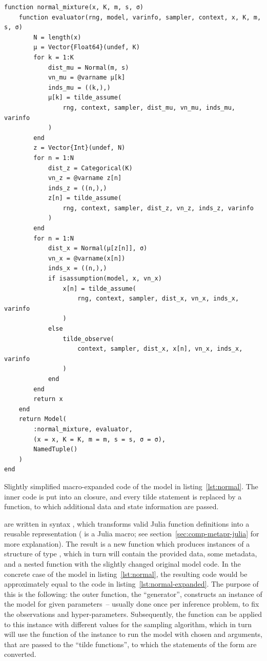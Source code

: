 \begin{lstfloat}
  \begin{lstlisting}[style=lstfloat]
function normal_mixture(x, K, m, s, σ)
    function evaluator(rng, model, varinfo, sampler, context, x, K, m, s, σ)
        N = length(x)
        μ = Vector{Float64}(undef, K)
        for k = 1:K
            dist_mu = Normal(m, s)
            vn_mu = @varname μ[k]
            inds_mu = ((k,),)
            μ[k] = tilde_assume(
                rng, context, sampler, dist_mu, vn_mu, inds_mu, varinfo
            )
        end
        z = Vector{Int}(undef, N)
        for n = 1:N
            dist_z = Categorical(K)
            vn_z = @varname z[n]
            inds_z = ((n,),)
            z[n] = tilde_assume(
                rng, context, sampler, dist_z, vn_z, inds_z, varinfo
            )
        end
        for n = 1:N
            dist_x = Normal(μ[z[n]], σ)
            vn_x = @varname(x[n])
            inds_x = ((n,),)
            if isassumption(model, x, vn_x)
                x[n] = tilde_assume(
                    rng, context, sampler, dist_x, vn_x, inds_x, varinfo
                )
            else
                tilde_observe(
                    context, sampler, dist_x, x[n], vn_x, inds_x, varinfo
                )
            end
        end
        return x
    end
    return Model(
        :normal_mixture, evaluator, 
        (x = x, K = K, m = m, s = s, σ = σ), 
        NamedTuple()
    )
end
\end{lstlisting}
  \caption{Slightly simplified macro-expanded code of the model in listing~\ref{lst:normal}.  The
    inner code is put into an \protect{} closure, and every tilde statement is
    replaced by a \protect{} function, to which additional data and state information
    are passed.\label{lst:normal-expanded}}
\end{lstfloat}
\setlength{\parskip}{0pt}

 are written in \dppljl{} syntax \parencite{tarek2020dynamicppl},
which transforms valid Julia function definitions into a reusable representation ( is
a Julia macro; see section~\ref{sec:comp-metapr-julia} for more explanation).  The result is a new
function which produces instances of a structure of type , which in turn will contain
the provided data, some metadata, and a nested function with the slightly changed original model
code. In the concrete case of the model in listing~\ref{lst:normal}, the resulting code would be
approximately equal to the code in listing~\ref{lst:normal-expanded}.  The purpose of this is the
following: the outer function, the \enquote{generator}, constructs an instance of the model for
given parameters~-- usually done once per inference problem, to fix the observations and
hyper-parameters.  Subsequently, the  function can be applied to this instance with
different values for the sampling algorithm, which in turn will use the  function
of the instance to run the model with chosen  and  arguments, that are
passed to the \enquote{tilde functions}, to which the statements of the form  are
converted.

